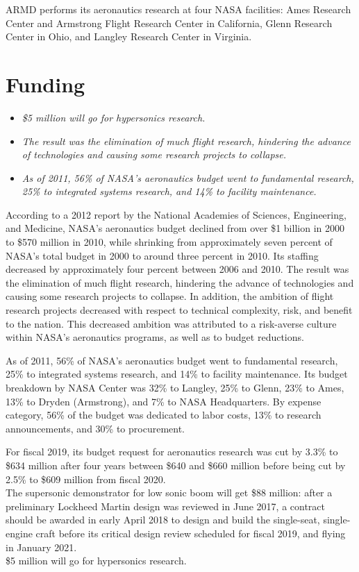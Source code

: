 ARMD performs its aeronautics research at four NASA facilities: Ames
Research Center and Armstrong Flight Research Center in California,
Glenn Research Center in Ohio, and Langley Research Center in Virginia.

\section{Funding}\label{funding}

\begin{itemize}
\item
  \emph{\$5 million will go for hypersonics research.}
\item
  \emph{The result was the elimination of much flight research,
  hindering the advance of technologies and causing some research
  projects to collapse.}
\item
  \emph{As of 2011, 56\% of NASA's aeronautics budget went to
  fundamental research, 25\% to integrated systems research, and 14\% to
  facility maintenance.}
\end{itemize}

According to a 2012 report by the National Academies of Sciences,
Engineering, and Medicine, NASA's aeronautics budget declined from over
\$1 billion in 2000 to \$570 million in 2010, while shrinking from
approximately seven percent of NASA's total budget in 2000 to around
three percent in 2010. Its staffing decreased by approximately four
percent between 2006 and 2010. The result was the elimination of much
flight research, hindering the advance of technologies and causing some
research projects to collapse. In addition, the ambition of flight
research projects decreased with respect to technical complexity, risk,
and benefit to the nation. This decreased ambition was attributed to a
risk-averse culture within NASA's aeronautics programs, as well as to
budget reductions.

As of 2011, 56\% of NASA's aeronautics budget went to fundamental
research, 25\% to integrated systems research, and 14\% to facility
maintenance. Its budget breakdown by NASA Center was 32\% to Langley,
25\% to Glenn, 23\% to Ames, 13\% to Dryden (Armstrong), and 7\% to NASA
Headquarters. By expense category, 56\% of the budget was dedicated to
labor costs, 13\% to research announcements, and 30\% to procurement.

For fiscal 2019, its budget request for aeronautics research was cut by
3.3\% to \$634 million after four years between \$640 and \$660 million
before being cut by 2.5\% to \$609 million from fiscal 2020.\\
The supersonic demonstrator for low sonic boom will get \$88 million:
after a preliminary Lockheed Martin design was reviewed in June 2017, a
contract should be awarded in early April 2018 to design and build the
single-seat, single-engine craft before its critical design review
scheduled for fiscal 2019, and flying in January 2021.\\
\$5 million will go for hypersonics research.

